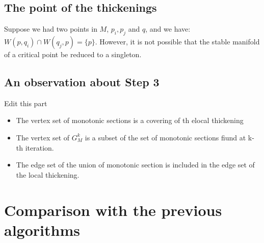\subsection{The point of the thickenings}

Suppose we had two points in $M$, $p_i,p_j$ and $q$, 
and we have: $W(p,q_i)\cap W(q_j,p)=\{p\}$.
However, it is not possible that the stable manifold of a critical point be reduced to a
singleton.

\subsection{An observation about Step 3}

{\color{red} Edit this part}
\begin{itemize}
    \item The vertex set of monotonic sections is a covering of th elocal thickening
        
    \item  The vertex set of $G_M^k$ is a subset of the set of monotonic sections fiund at k-th iteration.

    \item The edge set of the union of monotonic section is included in the edge set of the local thickening.
\end{itemize}


\section{Comparison with the previous algorithms}
